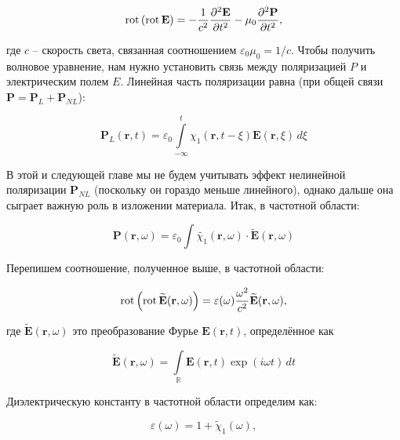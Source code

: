 \begin{equation}
	\mathop{\mathrm{rot}}\nolimits{\left( \mathop{\mathrm{rot}}\nolimits\mathbf{E} \right)} = - \frac{1}{c^2} \frac{\partial^2 \mathbf{E}}{\partial t^2} - \mu_0 \frac{\partial^2 \mathbf{P}}{\partial t^2},
\end{equation}

где $c$ -- скорость света, связанная соотношением $\varepsilon_0 \mu_0 = 1/c$. Чтобы получить волновое уравнение, нам нужно установить связь между поляризацией $P$ и электрическим полем $E$.
Линейная часть поляризации равна (при общей связи $\mathbf{P} = \mathbf{P}_{L} + \mathbf{P}_{NL}$):

\begin{equation}
	\mathbf{P}_L(\mathbf{r}, t) = \varepsilon_0 \int \limits_{-\infty}^{t} \chi_1 \left( \mathbf{r}, t - \xi \right) \mathbf{E}(\mathbf{r}, \xi) \, d\xi
\end{equation}

В этой и следующей главе мы не будем учитывать эффект нелинейной поляризации $\mathbf{P}_{NL}$ (поскольку он гораздо меньше линейного), однако дальше она сыграет важную роль в изложении материала. Итак, в частотной области:

\begin{equation}
	\mathbf{P}(\mathbf{r}, \omega) = \varepsilon_0 \int \widetilde{\chi_1} (\mathbf{r}, \omega) \cdot \widetilde{\mathbf{E}}(\mathbf{r}, \omega)
\end{equation}

Перепишем соотношение, полученное выше, в частотной области:

\begin{equation}
	\mathop{\mathrm{rot}}\nolimits{\left( \mathop{\mathrm{rot}}\nolimits\mathbf{\widetilde{E}}(\mathbf{r}, \omega) \right)} = \varepsilon(\omega) \frac{\omega^2}{c^2} \mathbf{\widetilde{E}}(\mathbf{r}, \omega),
\end{equation}

где $\mathbf{\widetilde{E}}(\mathbf{r}, \omega)$ это преобразование Фурье $\mathbf{E}(\mathbf{r}, t)$, определённое как

\begin{equation}
	\mathbf{\widetilde{E}}(\mathbf{r}, \omega) = \int \limits_{\mathbb{R}} \mathbf{E}(\mathbf{r}, t) \exp{(i \omega t)} \, dt
\end{equation}

Диэлектрическую константу в частотной области определим как:

\begin{equation}
	\varepsilon(\omega) = 1 + \widetilde{\chi}_1(\omega),
\end{equation}

